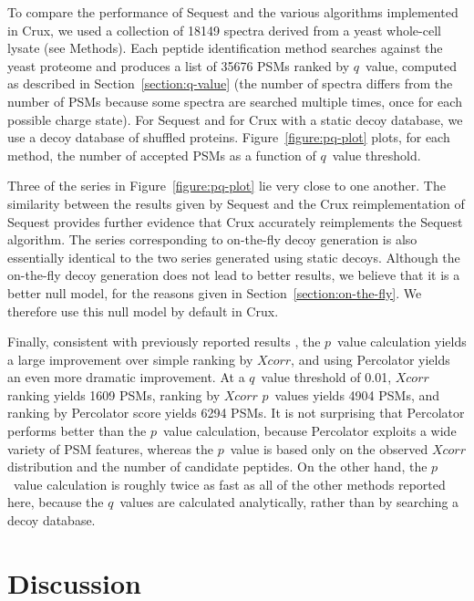 \documentclass[12pt]{article}
\begin{document}
To compare the performance of {\sc Sequest} and the various algorithms
implemented in Crux, we used a collection of 18149 spectra derived
from a yeast whole-cell lysate (see Methods).  Each peptide
identification method searches against the yeast proteome and produces
a list of 35676 PSMs ranked by $q$~value, computed as described in
Section~\ref{section:q-value} (the number of spectra differs from the number
of PSMs because some spectra are searched multiple times, once for each
possible charge state).  For {\sc Sequest} and for Crux with a static
decoy database, we use a decoy database of shuffled proteins.
Figure~\ref{figure:pq-plot} plots, for each method, the number of
accepted PSMs as a function of $q$~value threshold.

Three of the series in Figure~\ref{figure:pq-plot} lie very close to
one another.  The similarity between the results given by {\sc
Sequest} and the Crux reimplementation of {\sc Sequest} provides
further evidence that Crux accurately reimplements the {\sc Sequest}
algorithm.  The series corresponding to on-the-fly decoy generation is
also essentially identical to the two series generated using static
decoys.  Although the on-the-fly decoy generation does not lead to
better results, we believe that it is a better null model, for the
reasons given in Section~\ref{section:on-the-fly}.  We therefore use
this null model by default in Crux.

Finally, consistent with previously reported results
\cite{klammer:not, kall:semi-supervised}, the $p$~value calculation
yields a large improvement over simple ranking by $Xcorr$, and using
Percolator yields an even more dramatic improvement.  At a $q$~value
threshold of 0.01, $Xcorr$ ranking yields 1609 PSMs, ranking by
$Xcorr$ $p$~values yields 4904 PSMs, and ranking by Percolator score
yields 6294 PSMs.  It is not surprising that Percolator performs
better than the $p$~value calculation, because Percolator exploits a
wide variety of PSM features, whereas the $p$~value is based only on
the observed $Xcorr$ distribution and the number of candidate
peptides.  On the other hand, the $p$~value calculation is roughly
twice as fast as all of the other methods reported here, because the
$q$~values are calculated analytically, rather than by searching a
decoy database.

\section{Discussion}
\end{document}
